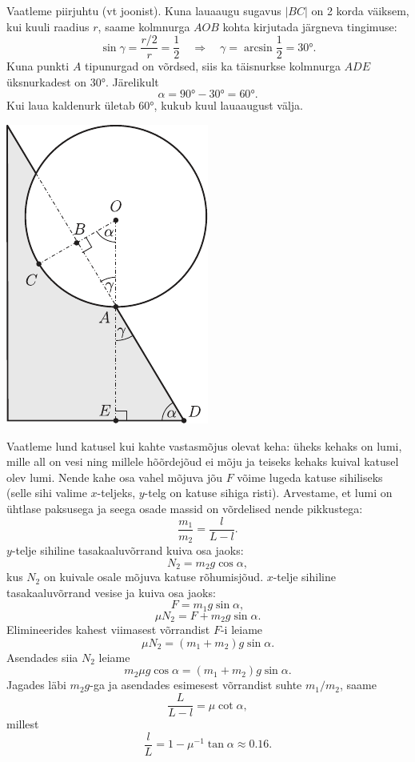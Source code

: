 \documentclass[10pt]{article}
\begin{document}
{Vaatleme piirjuhtu (vt joonist). Kuna lauaaugu sugavus $|BC|$ on 2 korda väiksem, kui kuuli raadius $r$, saame kolmnurga $AOB$ kohta kirjutada järgneva tingimuse:
\[
\sin \gamma=\frac{r / 2}{r}=\frac{1}{2} \quad \Rightarrow \quad \gamma=\arcsin \frac{1}{2}=\ang{30}.
\]
Kuna punkti $A$ tipunurgad on võrdsed, siis ka täisnurkse kolmnurga $ADE$ üksnurkadest on \ang{30}. Järelikult
\[
\alpha = \ang{90} - \ang{30} = \ang{60}.
\]
Kui laua kaldenurk ületab \ang{60}, kukub kuul lauaaugust välja.
\begin{center}
	\includegraphics[width=0.35\linewidth]{2005-lahg-03-lah}
\end{center}
\probend
\bigskip


\solu
Vaatleme lund katusel kui kahte vastasmõjus olevat keha: üheks kehaks on lumi, mille all on vesi ning millele hõõrdejõud ei mõju ja teiseks kehaks kuival katusel olev lumi. Nende kahe osa vahel mõjuva jõu $F$ võime lugeda katuse sihiliseks (selle sihi valime $x$-teljeks, $y$-telg on katuse sihiga risti). Arvestame, et lumi on ühtlase paksusega ja seega osade massid on võrdelised nende pikkustega: 
\[
\frac{m_1}{m_2} = \frac{l}{L-l}.
\]
$y$-telje sihiline tasakaaluvõrrand kuiva osa jaoks:
\[
N_2 = m_2g \cos \alpha,
\]
kus $N_2$ on kuivale osale mõjuva katuse rõhumisjõud. $x$-telje sihiline tasakaaluvõrrand vesise ja kuiva osa jaoks:
\[
F = m_1g \sin \alpha,
\]
\[
\mu N_2 = F + m_2g \sin \alpha.
\]
Elimineerides kahest viimasest võrrandist $F$-i leiame
\[
\mu N_2 = (m_1 + m_2) g \sin \alpha.
\]
Asendades siia $N_2$ leiame
\[
m_2\mu g \cos \alpha = (m_1 + m_2) g \sin \alpha.
\]
Jagades läbi $m_2g$-ga ja asendades esimesest võrrandist suhte $m_1/m_2$, saame
\[
\frac{L}{L-l}=\mu \cot \alpha,
\]
millest
\[
\frac{l}{L}=1-\mu^{-1} \tan \alpha \approx \num{0,16}.
\]

}
\end{document}
